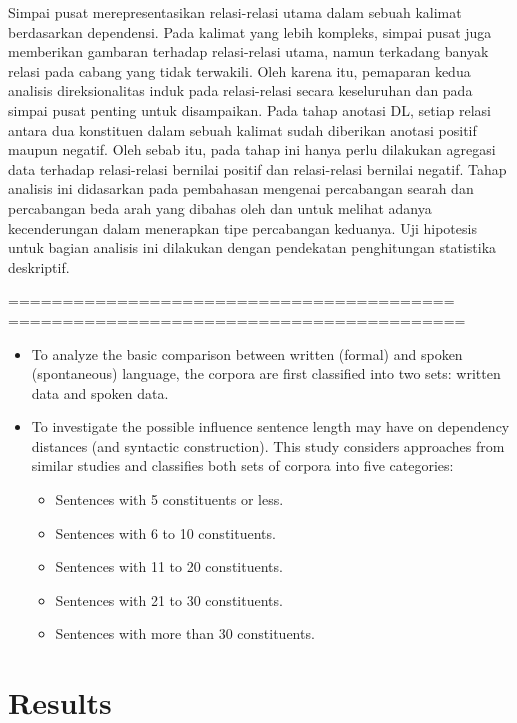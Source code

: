 \documentclass[10pt, a4paper, conference, compsocconf]{IEEEtran}
\begin{document}
Simpai pusat merepresentasikan relasi-relasi utama dalam sebuah kalimat berdasarkan dependensi. Pada kalimat yang lebih kompleks, simpai pusat juga memberikan gambaran terhadap relasi-relasi utama, namun terkadang banyak relasi pada cabang yang tidak terwakili. Oleh karena itu, pemaparan kedua analisis direksionalitas induk pada relasi-relasi secara keseluruhan dan pada simpai pusat penting untuk disampaikan. Pada tahap anotasi DL, setiap relasi antara dua konstituen dalam sebuah kalimat sudah diberikan anotasi positif maupun negatif. Oleh sebab itu, pada tahap ini hanya perlu dilakukan agregasi data terhadap relasi-relasi bernilai positif dan relasi-relasi bernilai negatif. Tahap analisis ini didasarkan pada pembahasan mengenai percabangan searah dan percabangan beda arah yang dibahas oleh \cite{temperley2008dependency} dan \cite{dryer1992greenbergian} untuk melihat adanya kecenderungan dalam menerapkan tipe percabangan keduanya. Uji hipotesis untuk bagian analisis ini dilakukan dengan pendekatan penghitungan statistika deskriptif.

=========================================
==========================================

\begin{itemize}
\item To analyze the basic comparison between written (formal) and spoken (spontaneous) language, the corpora are first classified into two sets: written data and spoken data.
\item To investigate the possible influence sentence length may have on dependency distances (and syntactic construction). This study considers approaches from similar studies \citep{oya2011syntactic, jiang2015effects} and classifies both sets of corpora into five categories:
\begin{itemize}
\item Sentences with 5 constituents or less.
\item Sentences with 6 to 10 constituents.
\item Sentences with 11 to 20 constituents.
\item Sentences with 21 to 30 constituents.
\item Sentences with more than 30 constituents.
\end{itemize}
\end{itemize}

\section{Results}
\end{document}
